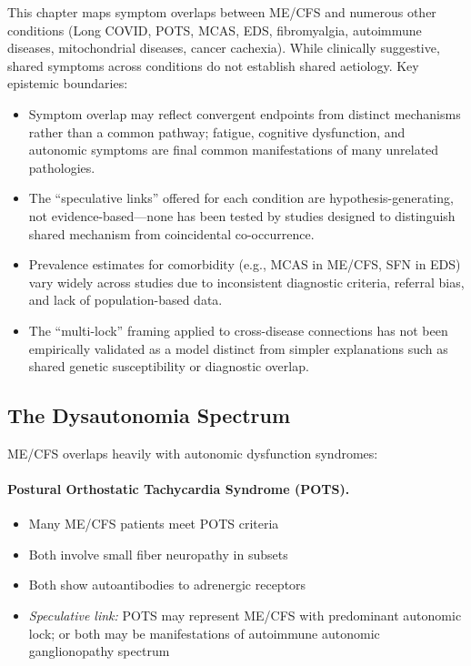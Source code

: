 \begin{limitation}
This chapter maps symptom overlaps between ME/CFS and numerous other conditions (Long COVID, POTS, MCAS, EDS, fibromyalgia, autoimmune diseases, mitochondrial diseases, cancer cachexia). While clinically suggestive, shared symptoms across conditions do not establish shared aetiology. Key epistemic boundaries:
\begin{itemize}
    \item Symptom overlap may reflect convergent endpoints from distinct mechanisms rather than a common pathway; fatigue, cognitive dysfunction, and autonomic symptoms are final common manifestations of many unrelated pathologies.
    \item The ``speculative links'' offered for each condition are hypothesis-generating, not evidence-based---none has been tested by studies designed to distinguish shared mechanism from coincidental co-occurrence.
    \item Prevalence estimates for comorbidity (e.g., MCAS in ME/CFS, SFN in EDS) vary widely across studies due to inconsistent diagnostic criteria, referral bias, and lack of population-based data.
    \item The ``multi-lock'' framing applied to cross-disease connections has not been empirically validated as a model distinct from simpler explanations such as shared genetic susceptibility or diagnostic overlap.
\end{itemize}
\end{limitation}

\subsection{The Dysautonomia Spectrum}

ME/CFS overlaps heavily with autonomic dysfunction syndromes:

\paragraph{Postural Orthostatic Tachycardia Syndrome (POTS).}
\begin{itemize}
    \item Many ME/CFS patients meet POTS criteria
    \item Both involve small fiber neuropathy in subsets
    \item Both show autoantibodies to adrenergic receptors
    \item \textit{Speculative link:} POTS may represent ME/CFS with predominant autonomic lock; or both may be manifestations of autoimmune autonomic ganglionopathy spectrum
\end{itemize}

